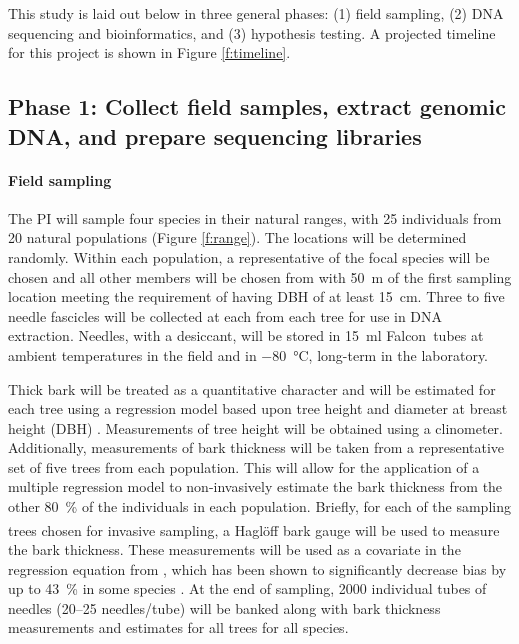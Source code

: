 This study is laid out below in three general phases: (1) field sampling, (2) DNA sequencing and bioinformatics, and (3) 
hypothesis testing.  A projected timeline for this project is shown in Figure \ref{f:timeline}.

\subsection*{Phase 1: Collect field samples, extract genomic DNA, and prepare sequencing libraries}

\paragraph{Field sampling}

The PI will sample four species in their natural ranges, with 25 individuals from 20 natural populations (Figure \ref{f:range}).  
The locations will be determined randomly.  Within each population, a representative 
of the focal species will be chosen and all other members will be chosen from with \SI{50}{m} of the first sampling location meeting 
the requirement of having DBH of at least \SI{15}{\cm}.  Three to five needle fascicles will be collected at each from each 
tree for use in DNA extraction.  Needles, with a desiccant, will be stored in \SI{15}{\ml} Falcon\texttrademark\ tubes  at 
ambient temperatures in the field and in \SI{-80}{\celsius}, long-term in the laboratory.  

Thick bark will be treated as a quantitative character and will be estimated for each tree using a regression model based 
upon tree height and diameter at breast height (DBH) \citep{Cao:1986th, Li:2010bl}.  Measurements of tree height will be obtained using a 
clinometer.  Additionally, measurements of bark thickness will be taken from a representative set of five trees from each population.  
This will allow for the application of a multiple regression model to non-invasively estimate the bark thickness from the other 
\SI{80}{\percent} of the individuals in each population.  Briefly, for each of the sampling trees chosen for invasive sampling, a 
Hagl\"{o}ff\textsuperscript{\textregistered} bark gauge will be used to measure the bark thickness.  These measurements will be used as a covariate in the 
regression equation from \citeauthor{Cao:1986th}, which has been shown to significantly decrease bias by up to \SI{43}{\percent} 
in some species \citep{Li:2010bl}.  At the end of sampling, \num{2000} individual tubes of needles (20--25 needles/tube) 
will be banked along with bark thickness measurements and estimates for all trees for all species.

